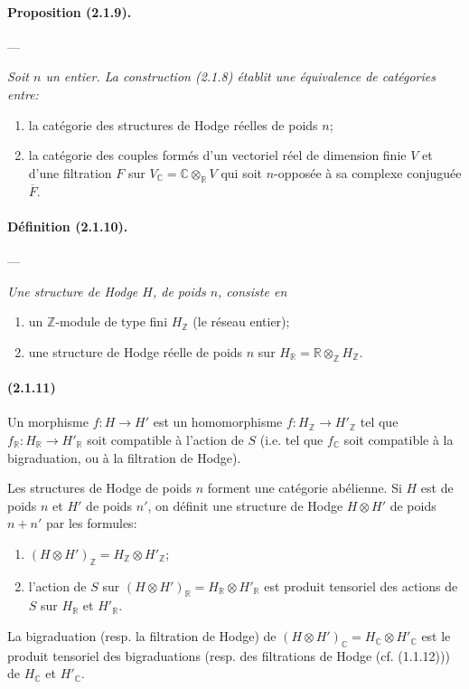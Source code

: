 \documentclass[10pt]{article}
\newcommand{\C}{\mathbb C}
\newcommand{\Z}{\mathbb Z}
\newcommand{\fg}{\guillemotright}
\newcommand{\og}{\guillemotleft}
\newcommand{\R}{\mathbb R}
\begin{document}
\paragraph{Proposition (2.1.9).} --- {\itshape Soit $n$ un entier. La construction (2.1.8) établit une équivalence de catégories entre:
\begin{enumerate}[label=\alph*)]
\item la catégorie des structures de Hodge réelles de poids $n$;
\item la catégorie des couples formés d'un vectoriel réel de dimension finie $V$ et d'une filtration $F$ sur $V_\C=\C\otimes_\R V$ qui soit $n$-opposée à sa complexe conjuguée $\overline F$.
\end{enumerate}}

\paragraph{Définition (2.1.10).} --- {\itshape Une structure de Hodge $H$, de poids $n$, consiste en
\begin{enumerate}[label=\alph*)]
\item un $\Z$-module de type fini $H_\Z$ (le \og réseau entier\fg{});
\item une structure de Hodge réelle de poids $n$ sur $H_\R=\R\otimes_\Z H_\Z$.
\end{enumerate}}

\paragraph{(2.1.11)} Un morphisme $f:H\to H'$ est un homomorphisme $f:H_\Z\to H'_\Z$ tel que $f_\R:H_\R\to H'_\R$ soit compatible à l'action de $S$ (i.e. tel que $f_\C$ soit compatible à la bigraduation, ou à la filtration de Hodge).

Les structures de Hodge de poids $n$ forment une catégorie abélienne. Si $H$ est de poids $n$ et $H'$ de poids $n'$, on définit une structure de Hodge $H\otimes H'$ de poids $n+n'$ par les formules:
\begin{enumerate}[label=\alph*)]
\item $(H\otimes H')_\Z=H_\Z\otimes H'_\Z$;
\item l'action de $S$ sur $(H\otimes H')_\R=H_\R\otimes H'_\R$ est produit tensoriel des actions de $S$ sur $H_\R$ et $H'_\R$.
\end{enumerate}
La bigraduation (resp. la filtration de Hodge) de $(H\otimes H')_\C=H_\C\otimes H'_\C$ est le produit tensoriel des bigraduations (resp. des filtrations de Hodge (cf. (1.1.12))) de $H_\C$ et $H'_\C$.
\end{document}
